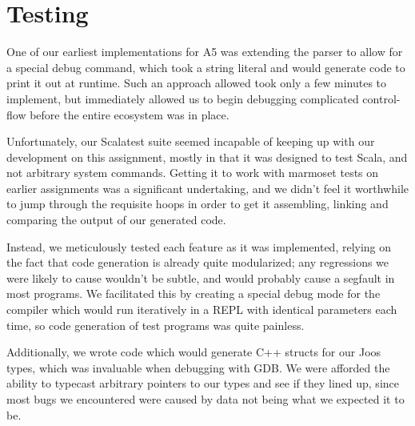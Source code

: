 \documentclass{article}
\begin{document}
\section{Testing}
One of our earliest implementations for A5 was extending the parser to allow for a special debug command, which took a
string literal and would generate code to print it out at runtime. Such an approach allowed took only a few minutes to
implement, but immediately allowed us to begin debugging complicated control-flow before the entire ecosystem was in
place.

Unfortunately, our Scalatest suite seemed incapable of keeping up with our development on this assignment, mostly in
that it was designed to test Scala, and not arbitrary system commands. Getting it to work with marmoset tests on earlier
assignments was a significant undertaking, and we didn't feel it worthwhile to jump through the requisite hoops in order
to get it assembling, linking and comparing the output of our generated code.

Instead, we meticulously tested each feature as it was implemented, relying on the fact that code generation is already
quite modularized; any regressions we were likely to cause wouldn't be subtle, and would probably cause a segfault in
most programs. We facilitated this by creating a special debug mode for the compiler which would run iteratively in a
REPL with identical parameters each time, so code generation of test programs was quite painless.

Additionally, we wrote code which would generate C++ structs for our Joos types, which was invaluable when debugging
with GDB. We were afforded the ability to typecast arbitrary pointers to our types and see if they lined up, since most
bugs we encountered were caused by data not being what we expected it to be.
\end{document}
